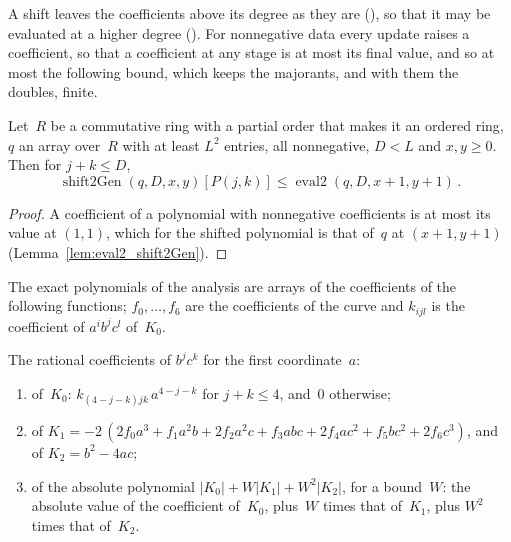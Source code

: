 A shift leaves the coefficients above its degree as they are
(), so that it may be evaluated at a higher degree
(). For nonnegative data every update raises a coefficient, so
that a coefficient at any stage is at most its final value, and so at most the following bound,
which keeps the majorants, and with them the doubles, finite.

\begin{lemma}\label{lem:getElem!_shift2Gen_le_eval2}
  \leanok
  Let~$R$ be a commutative ring with a partial order that makes it an ordered ring, $q$ an array
  over~$R$ with at least $L^2$ entries, all nonnegative, $D < L$ and $x, y \ge 0$. Then for
  $j + k \le D$,
  \[
    \operatorname{shift2Gen}(q, D, x, y)[P(j, k)] \le \operatorname{eval2}(q, D, x + 1, y + 1)\,.
  \]
\end{lemma}

\begin{proof}
  \leanok
  A coefficient of a polynomial with nonnegative coefficients is at most its value at $(1, 1)$,
  which for the shifted polynomial is that of~$q$ at $(x + 1, y + 1)$
  (Lemma~\ref{lem:eval2_shift2Gen}).
\end{proof}

The exact polynomials of the analysis are arrays of the coefficients of the following functions;
$f_0, \dots, f_6$ are the coefficients of the curve and $k_{ijl}$ is the coefficient of
$a^i b^j c^l$ of~$K_0$.

\begin{definition}\label{def:k0Coeff}
  \leanok
  The rational coefficients of $b^j c^k$ for the first coordinate~$a$:
  \begin{enumerate}
    \item of~$K_0$: $k_{(4-j-k)jk}\, a^{4-j-k}$ for $j + k \le 4$, and~$0$ otherwise;
    \item of $K_1 = -2\,(2 f_0 a^3 + f_1 a^2 b + 2 f_2 a^2 c + f_3 abc + 2 f_4 ac^2 + f_5 bc^2
      + 2 f_6 c^3)$, and of $K_2 = b^2 - 4ac$;
    \item of the absolute polynomial $|K_0| + W|K_1| + W^2|K_2|$, for a bound~$W$: the absolute
      value of the coefficient of~$K_0$, plus~$W$ times that of~$K_1$, plus $W^2$ times that
      of~$K_2$.
  \end{enumerate}
\end{definition}

